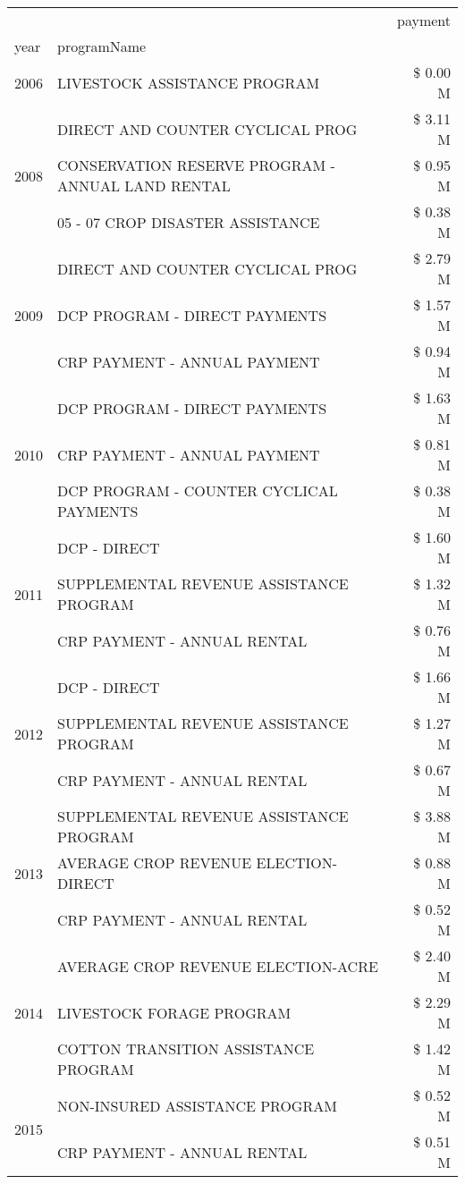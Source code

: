 \begin{tabular}{llr}
\toprule
 &  & payment \\
year & programName &  \\
\midrule
2006 & LIVESTOCK ASSISTANCE PROGRAM & \$ 0.00 M \\
\cline{1-3}
\multirow[t]{3}{*}{2008} & DIRECT AND COUNTER CYCLICAL PROG & \$ 3.11 M \\
 & CONSERVATION RESERVE PROGRAM - ANNUAL LAND RENTAL & \$ 0.95 M \\
 & 05 - 07 CROP DISASTER ASSISTANCE & \$ 0.38 M \\
\cline{1-3}
\multirow[t]{3}{*}{2009} & DIRECT AND COUNTER CYCLICAL PROG & \$ 2.79 M \\
 & DCP PROGRAM - DIRECT PAYMENTS & \$ 1.57 M \\
 & CRP PAYMENT - ANNUAL PAYMENT & \$ 0.94 M \\
\cline{1-3}
\multirow[t]{3}{*}{2010} & DCP PROGRAM - DIRECT PAYMENTS & \$ 1.63 M \\
 & CRP PAYMENT - ANNUAL PAYMENT & \$ 0.81 M \\
 & DCP PROGRAM - COUNTER CYCLICAL PAYMENTS & \$ 0.38 M \\
\cline{1-3}
\multirow[t]{3}{*}{2011} & DCP - DIRECT & \$ 1.60 M \\
 & SUPPLEMENTAL REVENUE ASSISTANCE PROGRAM & \$ 1.32 M \\
 & CRP PAYMENT - ANNUAL RENTAL & \$ 0.76 M \\
\cline{1-3}
\multirow[t]{3}{*}{2012} & DCP - DIRECT & \$ 1.66 M \\
 & SUPPLEMENTAL REVENUE ASSISTANCE PROGRAM & \$ 1.27 M \\
 & CRP PAYMENT - ANNUAL RENTAL & \$ 0.67 M \\
\cline{1-3}
\multirow[t]{3}{*}{2013} & SUPPLEMENTAL REVENUE ASSISTANCE PROGRAM & \$ 3.88 M \\
 & AVERAGE CROP REVENUE ELECTION-DIRECT & \$ 0.88 M \\
 & CRP PAYMENT - ANNUAL RENTAL & \$ 0.52 M \\
\cline{1-3}
\multirow[t]{3}{*}{2014} & AVERAGE CROP REVENUE ELECTION-ACRE & \$ 2.40 M \\
 & LIVESTOCK FORAGE PROGRAM & \$ 2.29 M \\
 & COTTON TRANSITION ASSISTANCE PROGRAM & \$ 1.42 M \\
\cline{1-3}
\multirow[t]{3}{*}{2015} & NON-INSURED ASSISTANCE PROGRAM & \$ 0.52 M \\
 & CRP PAYMENT - ANNUAL RENTAL & \$ 0.51 M \\

\end{tabular}
